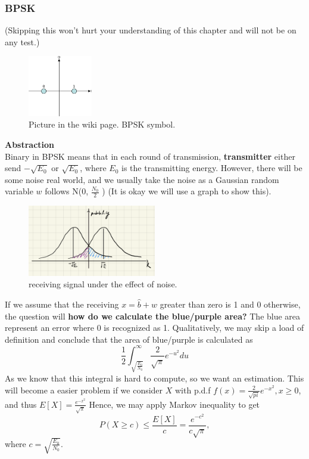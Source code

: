 \subsubsection*{BPSK}
(Skipping this won't hurt your understanding of this chapter and will not be on any test.)\\ 
\begin{figure}[hbt]
    \centering
    \includegraphics[width=0.25\textwidth]{./Figures/Constellation.png}
    \caption*{Picture in the wiki page. BPSK symbol.}
\end{figure}
\textbf{Abstraction}\\
Binary in BPSK means that in each round of transmission, \textbf{transmitter} either send \(-\sqrt{E_0}\) or \(\sqrt{E_0}\), where \(E_0\) is the transmitting energy. 
However, there will be some noise real world, and we usually take the noise as a Gaussian random variable \(w\) follows N(0, \(\frac{N_0}{2}\) ) (It is okay we will use a graph to show this). 
\begin{figure}[hbt]
    \centering
    \includegraphics[width=0.5\textwidth]{./Figures/BPSK.png}
    \caption*{receiving signal under the effect of noise.}
\end{figure}
If we assume that the receiving \(x = \hat{b} + w\) greater than zero is 1 and 0 otherwise, the question will \textbf{how do we calculate the blue/purple area?}
The blue area represent an error where 0 is recognized as 1.   
Qualitatively, we may skip a load of definition and conclude that the area of blue/purple is calculated as
\[
    \frac{1}{2}\int_{\sqrt{\frac{E_0}{N_0}}}^{\infty} \frac{2}{\sqrt{\pi } }e^{-u^2}du  
\] 
As we know that this integral is hard to compute, so we want an estimation. 
This will become a easier problem if we consider \(X\) with p.d.f \(f(x) = \frac{2}{\sqrt{pi} } e^{-x^2}, x \geq  0\), and thus \(E[X] = \frac{e^{-x^2}}{\sqrt{\pi } }\)      
Hence, we may apply Markov inequality to get 
\[
    P (X \geq c ) \leq \frac{E[X]}{c} = \frac{e^{-c^2}}{c\sqrt{\pi } }, 
\] 
where \(c = \sqrt{ \frac{E_0}{N_0}}\). 
